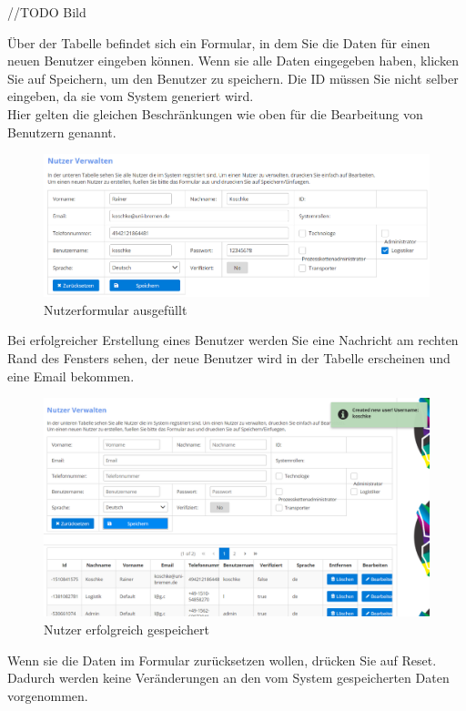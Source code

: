 \documentclass[enabledeprecatedfontcommands,fontsize=12pt,paper=a4,twoside]{scrartcl}
\begin{document}
//TODO Bild

Über der Tabelle befindet sich ein Formular, in dem Sie die Daten für einen neuen Benutzer eingeben können. Wenn sie alle Daten eingegeben haben, klicken Sie auf Speichern, um den Benutzer zu speichern. Die ID müssen Sie nicht selber eingeben, da sie vom System generiert wird. \\
Hier gelten die gleichen Beschränkungen wie oben für die Bearbeitung von Benutzern genannt. \\

\begin{figure}[h!]
\begin{center}
 \includegraphics[width=\textwidth]{screenshots/admin/nutzerformularausgefuellt.png}
  \caption{Nutzerformular ausgefüllt}
  \label{fig:boat3}
\end{center}
\end{figure}

Bei erfolgreicher Erstellung eines Benutzer werden Sie eine Nachricht am rechten Rand des Fensters sehen, der neue Benutzer wird in der Tabelle erscheinen und eine Email bekommen. 
\begin{figure}[h!]
\begin{center}
 \includegraphics[width=\textwidth]{screenshots/admin/nutzererfolgreich.png}
  \caption{Nutzer erfolgreich gespeichert}
  \label{fig:boat1}
\end{center}
\end{figure}
Wenn sie die Daten im Formular zurücksetzen wollen, drücken Sie auf Reset. Dadurch werden keine Veränderungen an den vom System gespeicherten Daten vorgenommen. \\ 
\end{document}
